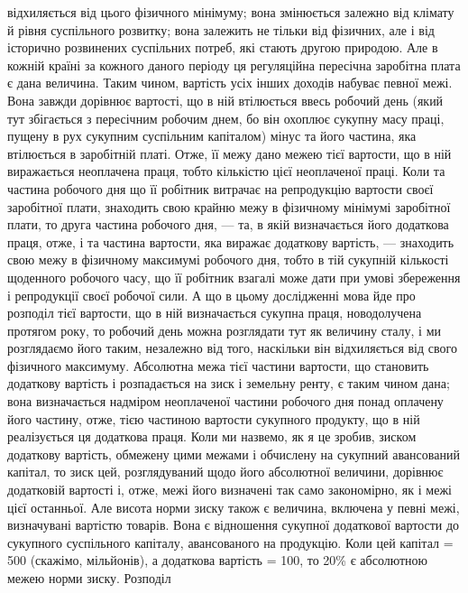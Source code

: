 \parcont{}  %
відхиляється від цього фізичного мінімуму; вона змінюється залежно від клімату
й рівня суспільного розвитку; вона залежить не тільки від фізичних, але
і від історично розвинених суспільних потреб, які стають другою природою.
Але в кожній країні за кожного даного періоду ця регуляційна пересічна заробітна
плата є дана величина. Таким чином, вартість усіх інших доходів набуває
певної межі. Вона завжди дорівнює вартості, що в ній втілюється ввесь
робочий день (який тут збігається з пересічним робочим днем, бо він охоплює
сукупну масу праці, пущену в рух сукупним суспільним капіталом) мінус та
його частина, яка втілюється в заробітній платі. Отже, її межу дано межею
тієї вартости, що в ній виражається неоплачена праця, тобто кількістю цієї
неоплаченої праці. Коли та частина робочого дня що її робітник витрачає на
репродукцію вартости своєї заробітної плати, знаходить свою крайню межу
в фізичному мінімумі заробітної плати, то друга частина робочого дня, — та,
в якій визначається його додаткова праця, отже, і та частина вартости, яка
виражає додаткову вартість, — знаходить свою межу в фізичному максимумі
робочого дня, тобто в тій сукупній кількості щоденного робочого часу, що
її робітник взагалі може дати при умові збереження і репродукції своєї робочої
сили. А що в цьому дослідженні мова йде про розподіл тієї вартости, що
в ній визначається сукупна праця, новодолучена протягом року, то робочий
день можна розглядати тут як величину сталу, і ми розглядаємо його таким,
незалежно від того, наскільки він відхиляється від свого фізичного максимуму.
Абсолютна межа тієї частини вартости, що становить додаткову вартість і
розпадається на зиск і земельну ренту, є таким чином дана; вона визначається
надміром неоплаченої частини робочого дня понад оплачену його
частину, отже, тією частиною вартости сукупного продукту, що в ній реалізується
ця додаткова праця. Коли ми назвемо, як я це зробив, зиском додаткову
вартість, обмежену цими межами і обчислену на сукупний авансований
капітал, то зиск цей, розглядуваний щодо його абсолютної величини, дорівнює
додатковій вартості і, отже, межі його визначені так само закономірно,
як і межі цієї останньої. Але висота норми зиску також є величина,
включена у певні межі, визначувані вартістю товарів. Вона є відношення
сукупної додаткової вартости до сукупного суспільного капіталу, авансованого
на продукцію. Коли цей капітал = 500 (скажімо, мільйонів), а додаткова
вартість = 100, то 20\% є абсолютною межею норми зиску. Розподіл
